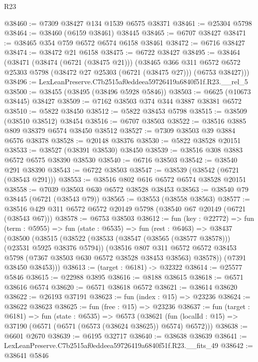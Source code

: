 \begin{lexlean}{R23}
\begin{coremodule}
@38460 := @7309 @38427 @134 @1539 @6575 @38371
@38461 := @25304 @5798
@38464 := @38460 (@6159 @38461) @38445
@38465 := @6707 @38427
@38471 := @38465 @354 @759 @6572 @6574 @6158 @38461
@38472 := @6716 @38427
@38474 := @38472 @21 @6158
@38475 := @6722 @38427
@38495 := @38464
    (@38471
      (@38474 (@6721 (@38475 @21)))
      (@38465
        @366
        @311
        @6572
        @6572
        @25303
        @5798
        (@38472 @27 @25303 (@6721 (@38475 @27)))
        (@6753 @38427)))
@38496 := LexLeanPreserve.C7b2515af0eddeea59726419a6840f51f.R23.__rel_5
@38500 := @38455 (@38495 (@38496 @5928 @5846))
@38503 := @6625 (@10673 @38445) @38427
@38509 := @7162 @38503 @374 @344 @3887 @38381 @6572
@38510 := @5822 @38450
@38512 := @5822 @38453 @5798
@38515 := @38509 (@38510 @38512) @38454
@38516 := @6707 @38503
@38522 := @38516 @3885 @809 @38379 @6574 @38450 @38512
@38527 := @7309 @38503 @39 @3884 @6576 @38378
@38528 := @20148 @38376
@38530 := @5822 @38528 @20151
@38533 := @38527 (@38391 @38530) @38450
@38539 := @38516 @308 @3883 @6572 @6575 @38390 @38530
@38540 := @6716 @38503
@38542 := @38540 @291 @38390
@38543 := @6722 @38503
@38547 := @38539 (@38542 (@6721 (@38543 @291)))
@38553 := @38516 @802 @616 @6572 @6574 @38528 @20151
@38558 := @7039 @38503 @630 @6572 @38528 @38453
@38563 := @38540 @79 @38445 (@6721 (@38543 @79))
@38565 := @38553 (@38558 @38563)
@38577 := @38516 @429 @311 @6572 @6572 @20149 @5798 (@38540 @67 @20149 (@6721 (@38543 @67)))
@38578 := @6753 @38503
@38612 := fun (key : @22772) =>
  fun (term : @5955) =>
  fun (state : @6535) =>
  fun (rest : @6463) =>
  @38437
    (@38500
      (@38515
        (@38522
          (@38533 (@38547 (@38565 (@38577 @38578))) (@23531 @5925 @38376 @5794))
          (@38516
            @807
            @311
            @6572
            @6572
            @38453
            @5798
            (@7367 @38503 @630 @6572 @38528 @38453 @38563)
            @38578))
        (@7391 @38450 @38453)))
@38613 := (target : @6181) -> @32322
@38614 := @25577 @5846
@38615 := @22988 @3895
@38616 := @8188 @38615
@38618 := @6571 @38616 @6574
@38620 := @6571 @38618 @6572
@38621 := @38614 @38620
@38622 := @26193 @37191
@38623 := fun (index : @15) => @23236
@38624 := @38622 @38623
@38625 := fun (free : @15) => @23236
@38637 := fun (target : @6181) =>
  fun (state : @6535) =>
  @6573 (@38621 (fun (localId : @15) => @37190 (@6571 (@6571 (@6573 (@38624 @38625)) @6574) @6572)))
@38638 := @6601 @2670
@38639 := @6195 @32717
@38640 := @38638 @38639
@38641 := LexLeanPreserve.C7b2515af0eddeea59726419a6840f51f.R23.__fits_49
@38642 := @38641 @5846

\end{coremodule}
\end{lexlean}
